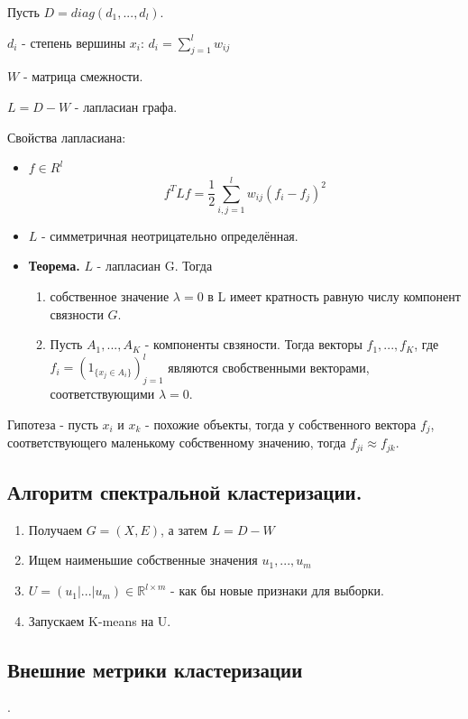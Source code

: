 \documentclass[12pt]{article}
\begin{document}
Пусть $D = diag(d_1, ..., d_l)$.

$d_i$ - степень вершины $x_i$: $d_i = \sum_{j=1}^l w_{ij}$

$W$ - матрица смежности.

$L = D-W$ - лапласиан графа.

Свойства лапласиана:

\begin{itemize}
    \item $f \in R^l$
    \[ f^T L f = \frac{1}{2} \sum_{i, j = 1}^l w_{ij} (f_i - f_j)^2 \]
    \item $L$ - симметричная неотрицательно определённая.
    \item \textbf{Теорема.} $L$ - лапласиан G. Тогда \begin{enumerate}
        \item собственное значение $\lambda = 0$ в L имеет кратность равную числу компонент связности $G$.
        \item Пусть $A_1, ..., A_K$ - компоненты свзяности. Тогда векторы $f_1, ..., f_K$, где $f_i = (1_{\{ x_j \in A_i \}})_{j=1}^l$ являются свобственными векторами, соответствующими $\lambda = 0$.
    \end{enumerate}
\end{itemize}

Гипотеза - пусть $x_i$ и $x_k$ - похожие объекты, тогда у собственного вектора $f_j$, соответствующего маленькому собственному значению, тогда $f_{ji} \approx f_{jk}$.

\subsection*{Алгоритм спектральной кластеризации.}


\begin{enumerate}
    \item Получаем $G = (X, E)$, а затем $L = D - W$
    \item Ищем наименьшие собственные значения $u_1,..., u_m$
    \item $U = (u_1|...|u_m) \in \mathbb{R}^{l \times m}$ - как бы новые признаки для выборки.
    \item Запускаем K-means на U.
\end{enumerate}

\subsection{Внешние метрики кластеризации}.
\end{document}
